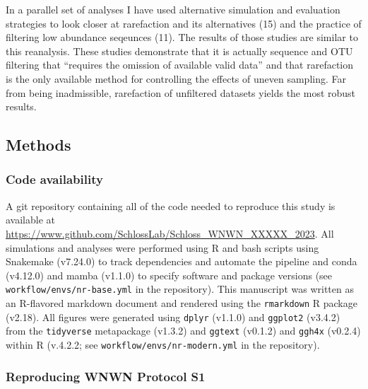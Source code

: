 \documentclass[
]{article}
\begin{document}
In a parallel set of analyses I have used alternative simulation and
evaluation strategies to look closer at rarefaction and its alternatives
(15) and the practice of filtering low abundance seqeunces (11). The
results of those studies are similar to this reanalysis. These studies
demonstrate that it is actually sequence and OTU filtering that
``requires the omission of available valid data'' and that rarefaction
is the only available method for controlling the effects of uneven
sampling. Far from being inadmissible, rarefaction of unfiltered
datasets yields the most robust results.

\hypertarget{methods}{%
\subsection{Methods}\label{methods}}

\hypertarget{code-availability}{%
\subsubsection{Code availability}\label{code-availability}}

A git repository containing all of the code needed to reproduce this
study is available at
\url{https://www.github.com/SchlossLab/Schloss_WNWN_XXXXX_2023}. All
simulations and analyses were performed using R and bash scripts using
Snakemake (v7.24.0) to track dependencies and automate the pipeline and
conda (v4.12.0) and mamba (v1.1.0) to specify software and package
versions (see \texttt{workflow/envs/nr-base.yml} in the repository).
This manuscript was written as an R-flavored markdown document and
rendered using the \texttt{rmarkdown} R package (v2.18). All figures
were generated using \texttt{dplyr} (v1.1.0) and \texttt{ggplot2}
(v3.4.2) from the \texttt{tidyverse} metapackage (v1.3.2) and
\texttt{ggtext} (v0.1.2) and \texttt{ggh4x} (v0.2.4) within R (v.4.2.2;
see \texttt{workflow/envs/nr-modern.yml} in the repository).

\hypertarget{reproducing-wnwn-protocol-s1}{%
\subsubsection{Reproducing WNWN Protocol
S1}\label{reproducing-wnwn-protocol-s1}}
\end{document}
